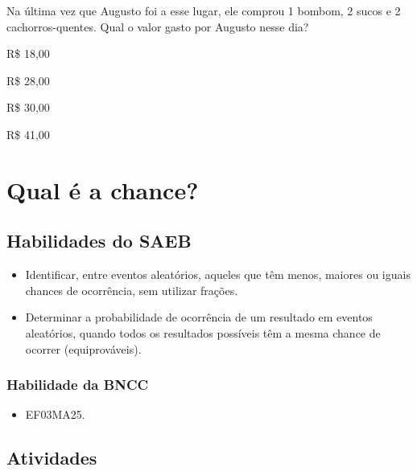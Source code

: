 Na última vez que Augusto foi a esse lugar, ele comprou 1 bombom, 2
sucos e 2 cachorros-quentes. Qual o valor gasto por Augusto nesse dia?

\begin{escolha}

\item
  R\$ 18,00
\item
  R\$ 28,00
\item
  R\$ 30,00
\item
  R\$ 41,00
\end{escolha}

\chapter{Qual é a chance?}

\section*{Habilidades do SAEB}

\begin{itemize}
\item Identificar, entre eventos aleatórios, aqueles que têm menos, maiores ou
iguais chances de ocorrência, sem utilizar frações.

\item Determinar a probabilidade de ocorrência de um resultado em eventos
aleatórios, quando todos os resultados possíveis têm a mesma chance de
ocorrer (equiprováveis).
\end{itemize}

\subsection{Habilidade da BNCC}

\begin{itemize}
  \item 
 EF03MA25.
\end{itemize}


\section*{Atividades}

